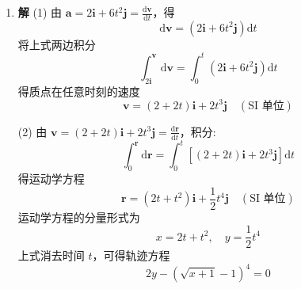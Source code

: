 \begin{enumerate}
(2) $t = 1 \mathrm{\ s}$ 时，质点的速率 $v$、切向加速度 $a_t$、法向加速度 $a_n$ 和加速度大小 $a$ 分别为
\[
v = R\omega = 10 \mathrm{\ m \cdot s^{-1}}
\]
\[
a_t = R\alpha = 18 \mathrm{\ m \cdot s^{-2}}
\]
\[
a_n = R\omega^2 = 100 \mathrm{\ m \cdot s^{-2}}
\]
\[
a = \sqrt{a_t^2 + a_n^2} = \sqrt{18^2 + 100^2} \mathrm{\ m \cdot s^{-2}} = 101.6 \mathrm{\ m \cdot s^{-2}}
\]

\vspace {2em}

\item[L1-7]


\textbf{解} \quad (1) 由 $\boldsymbol{a} = 2\boldsymbol{i} + 6t^2\boldsymbol{j} = \frac{\mathrm{d}\boldsymbol{v}}{\mathrm{d}t}$，得
$$
\mathrm{d}\boldsymbol{v} = (2\boldsymbol{i} + 6t^2\boldsymbol{j})\mathrm{d}t
$$
将上式两边积分
$$
\int_{2\boldsymbol{i}}^{\boldsymbol{v}} \mathrm{d}\boldsymbol{v} = \int_{0}^{t} (2\boldsymbol{i} + 6t^2\boldsymbol{j})\mathrm{d}t
$$
得质点在任意时刻的速度
$$
\boldsymbol{v} = (2 + 2t)\boldsymbol{i} + 2t^3\boldsymbol{j} \quad (\text{SI 单位})
$$

(2) 由 $\boldsymbol{v} = (2 + 2t)\boldsymbol{i} + 2t^3\boldsymbol{j} = \frac{\mathrm{d}\boldsymbol{r}}{\mathrm{d}t}$，积分:
$$
\int_{0}^{\boldsymbol{r}} \mathrm{d}\boldsymbol{r} = \int_{0}^{t} \left[ (2 + 2t)\boldsymbol{i} + 2t^3\boldsymbol{j} \right] \mathrm{d}t
$$
得运动学方程
$$
\boldsymbol{r} = (2t + t^2)\boldsymbol{i} + \frac{1}{2}t^4\boldsymbol{j} \quad (\text{SI 单位})
$$
运动学方程的分量形式为
$$
x = 2t + t^2, \quad y = \frac{1}{2}t^4
$$
上式消去时间 $t$，可得轨迹方程
$$
2y - \left(\sqrt{x + 1} - 1\right)^4 = 0
$$


\end{enumerate}